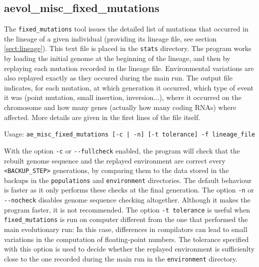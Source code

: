 \subsection{aevol\_misc\_fixed\_mutations}
\label{sect:ancstats}
The \verb?fixed_mutations? tool issues the detailed list of mutations that occurred in the lineage of a given individual (providing its lineage file, see section \ref{sect:lineage}). This text file is placed in the \verb?stats? directory. The program works by loading the initial genome at the beginning of the lineage, and then by replaying each mutation recorded in the lineage file. Environmental variations are also replayed exactly as they occured during the main run. The output file indicates, for each mutation, at which generation it occurred, which type of event it was (point mutation, small insertion, inversion...), where it occurred on the chromosome and how many genes (actually how many coding RNAs) where affected. More details are given in the first lines of the file itself.

Usage: \verb?ae_misc_fixed_mutations [-c | -n] [-t tolerance] -f lineage_file?

With the option \verb?-c? or \verb?--fullcheck? enabled, the program will check that the rebuilt genome sequence and the replayed environment are correct every \verb?<BACKUP_STEP>? generations, by comparing them to the data stored in the backups in the \verb?populations? and \verb?environment? directories. The default behaviour is faster as it only performs these checks at the final generation. The option \verb?-n? or \verb?--nocheck? disables genome sequence checking altogether. Although it makes the program faster, it is not recommended. The option \verb?-t tolerance? is useful when \verb?fixed_mutations? is run on computer different from the one that performed the main evolutionary run: In this case, differences in compilators can lead to small variations in the computation of floating-point numbers. The tolerance specified with this option is used to decide whether the replayed environment is sufficienlty close to the one recorded during the main run in the \verb?environment? directory.



